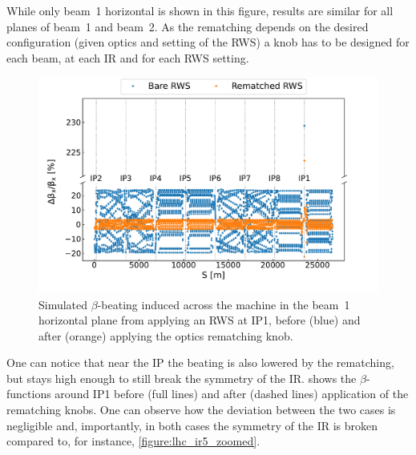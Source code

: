 While only beam~\num{1} horizontal is shown in this figure, results are similar for all planes of beam~\num{1} and beam~\num{2}.
As the rematching depends on the desired configuration (given optics and setting of the RWS) a knob has to be designed for each beam, at each IR and for each RWS setting.

\begin{figure}[!htb]
    \centering
    \includegraphics[width=\textwidth]{Figures/IR_Coupling_Correction/rws_ir1_b1_bbeating_rematched.pdf}
    \caption{Simulated \(\beta\)-beating induced across the machine in the beam~\num{1} horizontal plane from applying an RWS at IP\num{1}, before (\textcolor{mplblue}{blue}) and after (\textcolor{mplorange}{orange}) applying the optics rematching knob.}
    \label{figure:rws_rematching_efficiency}
\end{figure}

One can notice that near the IP the beating is also lowered by the rematching, but stays high enough to still break the symmetry of the IR.
 shows the \(\beta\)-functions around IP\num{1} before (full lines) and after (dashed lines) application of the rematching knobs.
One can observe how the deviation between the two cases is negligible and, importantly, in both cases the symmetry of the IR is broken compared to, for instance, \cref{figure:lhc_ir5_zoomed}.

